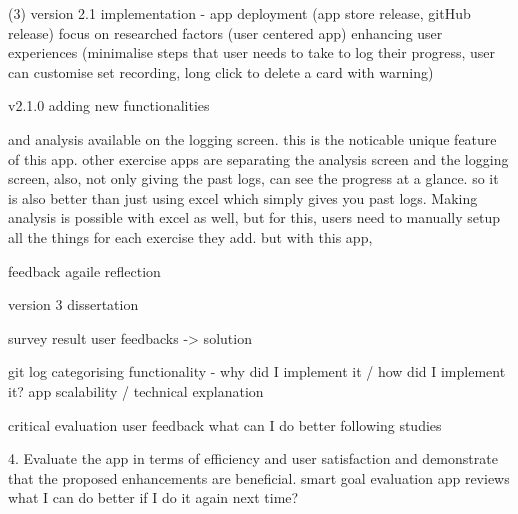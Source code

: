 (3) version 2.1 implementation - app deployment (app store release, gitHub release)
focus on researched factors (user centered app)
enhancing user experiences
(minimalise steps that user needs to take to log their progress, user can customise set recording, long click to delete a card with warning)



\version v2.1.0 {
    adding new functionalities
} 










and analysis available on the logging screen. 
this is the noticable unique feature of this app. 
other exercise apps are separating the analysis screen and the logging screen, 
also, not only giving the past logs, can see the progress at a glance. 
so it is also better than just using excel which simply gives you past logs.
Making analysis is possible with excel as well, but for this, users need to manually setup all the things for each exercise they add.
but with this app, 



feedback agaile reflection


version 3 dissertation

survey result
user feedbacks -> solution


git log categorising
functionality - why did I implement it / how did I implement it?
app scalability / technical explanation



critical evaluation
user feedback
what can I do better
following studies

4. Evaluate the app in terms of efficiency and user satisfaction and demonstrate that the proposed enhancements are beneficial.
	smart goal evaluation
	app reviews
	what I can do better if I do it again next time?
